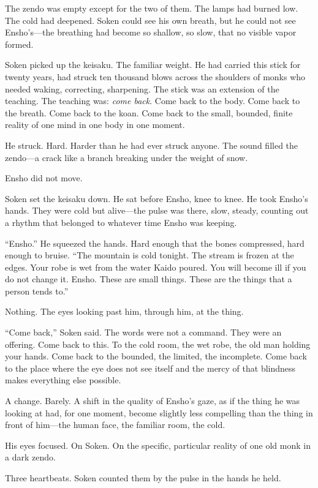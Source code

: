 The zendo was empty except for the two of them. The lamps had burned low. The cold had deepened. Soken could see his own breath, but he could not see Ensho's---the breathing had become so shallow, so slow, that no visible vapor formed.

Soken picked up the keisaku. The familiar weight. He had carried this stick for twenty years, had struck ten thousand blows across the shoulders of monks who needed waking, correcting, sharpening. The stick was an extension of the teaching. The teaching was: \emph{come back}. Come back to the body. Come back to the breath. Come back to the koan. Come back to the small, bounded, finite reality of one mind in one body in one moment.

He struck. Hard. Harder than he had ever struck anyone. The sound filled the zendo---a crack like a branch breaking under the weight of snow.

Ensho did not move.

Soken set the keisaku down. He sat before Ensho, knee to knee. He took Ensho's hands. They were cold but alive---the pulse was there, slow, steady, counting out a rhythm that belonged to whatever time Ensho was keeping.

``Ensho.'' He squeezed the hands. Hard enough that the bones compressed, hard enough to bruise. ``The mountain is cold tonight. The stream is frozen at the edges. Your robe is wet from the water Kaido poured. You will become ill if you do not change it. Ensho. These are small things. These are the things that a person tends to.''

Nothing. The eyes looking past him, through him, at the thing.

``Come back,'' Soken said. The words were not a command. They were an offering. Come back to this. To the cold room, the wet robe, the old man holding your hands. Come back to the bounded, the limited, the incomplete. Come back to the place where the eye does not see itself and the mercy of that blindness makes everything else possible.

A change. Barely. A shift in the quality of Ensho's gaze, as if the thing he was looking at had, for one moment, become slightly less compelling than the thing in front of him---the human face, the familiar room, the cold.

His eyes focused. On Soken. On the specific, particular reality of one old monk in a dark zendo.

Three heartbeats. Soken counted them by the pulse in the hands he held.

